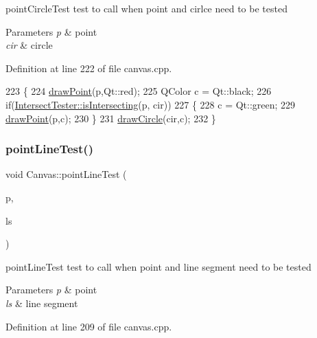 point\+Circle\+Test test to call when point and cirlce need to be tested 


\begin{DoxyParams}{Parameters}
{\em p} & point \\
\hline
{\em cir} & circle \\
\hline
\end{DoxyParams}


Definition at line 222 of file canvas.\+cpp.


\begin{DoxyCode}
223 \{
224     \hyperlink{class_canvas_ad7cf8e6e93765586808ac744d888dbdc}{drawPoint}(p,Qt::red);
225     QColor c = Qt::black;
226     \textcolor{keywordflow}{if}(\hyperlink{class_intersect_tester_a7710e17ff7d2e229059f23b9429213f5}{IntersectTester::isIntersecting}(p, cir))
227     \{
228         c = Qt::green;
229         \hyperlink{class_canvas_ad7cf8e6e93765586808ac744d888dbdc}{drawPoint}(p,c);
230     \}
231     \hyperlink{class_canvas_ab1413076d90539aea7ac3a06b065afe2}{drawCircle}(cir,c);
232 \}
\end{DoxyCode}
\mbox{\label{class_canvas_ad5681f0cada49f0453158155b42c2fb7}} 
\subsubsection{\texorpdfstring{point\+Line\+Test()}{pointLineTest()}}
{\footnotesize\ttfamily void Canvas\+::point\+Line\+Test (\begin{DoxyParamCaption}\item[{\hyperlink{class_point}{Point}}]{p,  }\item[{\hyperlink{class_line_segment}{Line\+Segment}}]{ls }\end{DoxyParamCaption})\hspace{0.3cm}{\ttfamily [private]}}



point\+Line\+Test test to call when point and line segment need to be tested 


\begin{DoxyParams}{Parameters}
{\em p} & point \\
\hline
{\em ls} & line segment \\
\hline
\end{DoxyParams}


Definition at line 209 of file canvas.\+cpp.


